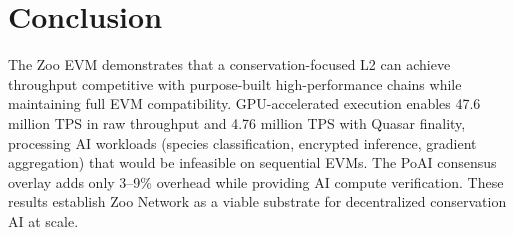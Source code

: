 \section{Conclusion}


The Zoo EVM demonstrates that a conservation-focused L2 can achieve throughput competitive with purpose-built high-performance chains while maintaining full EVM compatibility. GPU-accelerated execution enables 47.6 million TPS in raw throughput and 4.76 million TPS with Quasar finality, processing AI workloads (species classification, encrypted inference, gradient aggregation) that would be infeasible on sequential EVMs. The PoAI consensus overlay adds only 3--9\% overhead while providing AI compute verification. These results establish Zoo Network as a viable substrate for decentralized conservation AI at scale.

